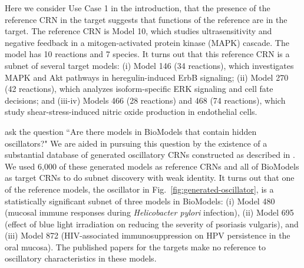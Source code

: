 \documentclass[webpdf,contemporary,large]{oup-authoring-template}
\newcommand{\revision}[1]{\color{red}{#1 }\color{black}}
\newcommand{\fig}[1]{
  Fig.~\ref{#1}}
\theoremstyle{thmstyleone}%
\theoremstyle{thmstyletwo}%
\theoremstyle{thmstylethree}%
\begin{document}
\revision{
\subsection{Use Case 1: Inferring Function in Targets}
}
Here we consider Use Case 1 in the introduction, that the presence of the reference CRN in the target suggests
that functions of the reference are in the target.
The reference CRN is Model 10, which studies ultrasensitivity and negative feedback  in a mitogen-activated protein kinase (MAPK) cascade.
The model has 10 reactions and 7 species.
It turns out that this reference CRN is a subnet of several target models: (i) Model 146 (34 reactions), which investigates MAPK and Akt pathways in heregulin-induced ErbB signaling; (ii) Model 270 (42 reactions), which analyzes isoform-specific ERK signaling and cell fate decisions; and (iii-iv) Models 466 (28 reactions) and 468 (74 reactions), which study shear-stress-induced nitric oxide production in endothelial cells.
\revision{We have strong confirmation that the MAPK function is present in the targets
since the paper associated with each model explicitly states that MAPK function is part of their model.}

\revision{We present another example of Use Case 1.
This
example lacks the strong
confirmation provided in the first example,
but it illustrate how subnet discovery can be used
to generate interesting hypotheses.
We} ask the question ``Are there models in BioModels that contain hidden oscillators?"
We are aided in pursuing this question by the existence of a substantial database
of generated oscillatory CRNs constructed as described in \citep{tatka_cesium_2023}.
We used 6,000 of these generated models as reference CRNs and all of BioModels as target CRNs
to do subnet discovery with weak identity.
It turns out that one of the reference models, the oscillator in \fig{fig:generated-oscillator}, is a statistically significant subnet of three models in BioModels: (i) Model 480 (mucosal immune responses during {\em Helicobacter pylori} infection), (ii) Model 695 (effect of blue light irradiation on reducing the severity of psoriasis vulgaris), and (iii) Model 872 (HIV-associated immunosuppression on HPV persistence in the oral mucosa).
The published papers for the targets make no reference to oscillatory characteristics in these models.
\end{document}
